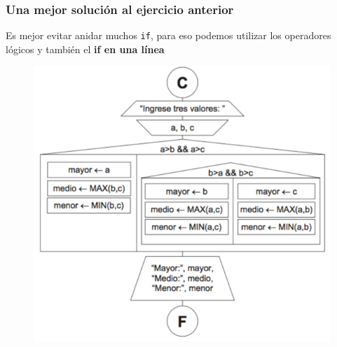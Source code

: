 \documentclass[handout]{beamer}
\begin{document}
\begin{frame}[t]\frametitle{Una mejor solución al ejercicio anterior}
    Es mejor evitar anidar muchos \texttt{if}, para eso podemos utilizar los operadores lógicos y también el \textbf{if en una línea}
\begin{figure}[tb]
  \centering
  \includegraphics[scale=.6]{./img/ifani2}
\end{figure}

\end{frame}


\end{document}
